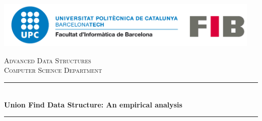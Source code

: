 \begin{titlepage}

\newcommand{\HRule}{\rule{\linewidth}{0.5mm}} %

\begin{center}
\includegraphics[width=12.75cm]{title/logo-upc.png}\\[1cm] %
\end{center}
 

\center %





\textsc{\LARGE Advanced Data Structures}\\[1.0cm] %
\textsc{\large Computer Science Department}\\[0.5cm] %

\makeatletter
\HRule \\[0.4cm]
{ \huge \bfseries Union Find Data Structure: An empirical analysis}\\[0.4cm] %
\HRule \\[1.5cm]
 \vspace{0.25cm}


\end{titlepage}
